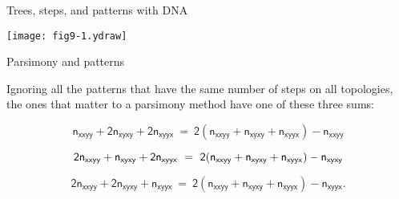 \documentclass[bluish,slideColor,colorBG,pdf]{prosper}
\begin{document}
\begin{slide}[Replace]{Trees, steps, and patterns with DNA}

\centerline{\texttt{[image: fig9-1.ydraw]}}

\end{slide}

\begin{slide}[Replace]{Parsimony and patterns}
\bigskip

Ignoring all the patterns that have the same number of steps on all topologies,
the ones that matter to a parsimony method have one of these three sums:

\[
\mathsf{n_{xxyy} + 2n_{xyxy} + 2n_{xyyx}\  = \ 2(n_{xxyy}+n_{xyxy}+n_{xyyx}) - n_{xxyy}}
\]
\medskip

\[
\mathsf{2n_{xxyy} + n_{xyxy} + 2n_{xyyx} \ = \ 2(n_{xxyy}+n_{xyxy}+n_{xyyx}) - n_{xyxy}}
\medskip
\]

\[
\mathsf{2n_{xxyy} + 2n_{xyxy} + n_{xyyx} \ = \ 2(n_{xxyy}+n_{xyxy}+n_{xyyx}) - n_{xyyx}.}
\]

\end{slide}
\end{document}
